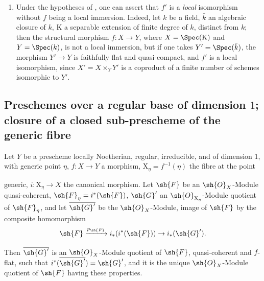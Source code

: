 \begin{remarks}[2.7.3]
\begin{enumerate}[label=(\roman*)]
  \item Under the hypotheses of , one can assert that $f'$ is a \emph{local}
isomorphism without $f$ being a local immersion. Indeed, let $k$ be a field, $\bar{k}$ an algebraic closure
of $k$, $\mathrm{K}$ a separable extension of finite degree of $k$, distinct from $k$; then the
structural morphism $f:X\to Y$, where $X=\Spec(\mathrm{K})$ and $Y=\Spec(k)$, is not a
local immersion, but if one takes $Y'=\Spec(\bar{k})$, the morphism $Y'\to Y$ is faithfully
flat and quasi-compact, and $f'$ is a local isomorphism, since $X'=X\times_Y Y'$ is a coproduct
of a finite number of schemes isomorphic to $Y'$.
\end{enumerate}
\end{remarks}

\subsection{Preschemes over a regular base of dimension \texorpdfstring{$1$}{1}; closure of a closed
sub-prescheme of the generic fibre}
\label{subsection:IV.2.8}

\begin{proposition}[2.8.1]
\label{IV.2.8.1}
Let $Y$ be a prescheme locally Noetherian, regular, irreducible,
and of dimension $1$, with generic point $\eta$, $f:X\to Y$ a morphism, $\mathrm{X}_\eta=f^{-1}(\eta)$ the fibre at the point


generic, $i:\mathrm{X}_\eta\to X$ the canonical morphism. Let $\sh{F}$ be an $\sh{O}_X$-Module quasi-coherent, $\sh{F}_\eta=i^*(\sh{F})$,
$\sh{G}'$ an $\sh{O}_{\mathrm{X}_\eta}$-Module quotient of $\sh{F}_\eta$, and let $\overline{\sh{G}'}$ be the $\sh{O}_X$-Module, image of $\sh{F}$ by the composite homomorphism
\[
  \sh{F} \xrightarrow{p_{\sh{F}}} i_*(i^*(\sh{F})) \to i_*(\sh{G}').
\]

Then $\overline{\sh{G}'}$ is an $\sh{O}_X$-Module quotient of $\sh{F}$, quasi-coherent and $f$-flat, such that $i^*(\overline{\sh{G}'})=\sh{G}'$, and it is
the unique $\sh{O}_X$-Module quotient of $\sh{F}$ having these properties.
\end{proposition}

